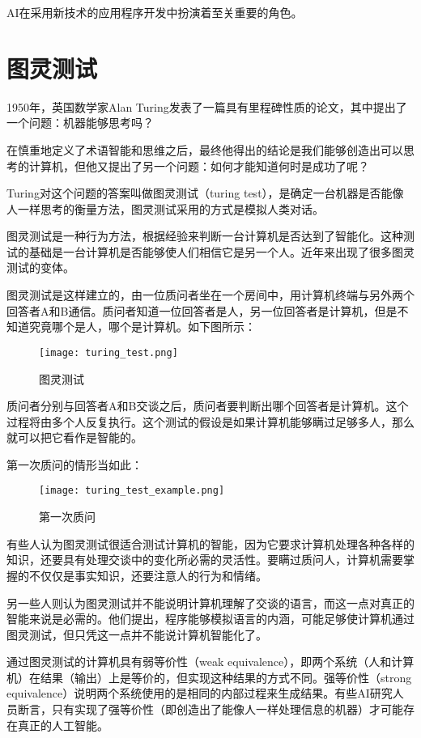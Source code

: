 AI在采用新技术的应用程序开发中扮演着至关重要的角色。

\section{图灵测试}

1950年，英国数学家Alan Turing发表了一篇具有里程碑性质的论文，其中提出了一个问题：机器能够思考吗？

在慎重地定义了术语智能和思维之后，最终他得出的结论是我们能够创造出可以思考的计算机，但他又提出了另一个问题：如何才能知道何时是成功了呢？

Turing对这个问题的答案叫做图灵测试（turing test），是确定一台机器是否能像人一样思考的衡量方法，图灵测试采用的方式是模拟人类对话。

图灵测试是一种行为方法，根据经验来判断一台计算机是否达到了智能化。这种测试的基础是一台计算机是否能够使人们相信它是另一个人。近年来出现了很多图灵测试的变体。

图灵测试是这样建立的，由一位质问者坐在一个房间中，用计算机终端与另外两个回答者A和B通信。质问者知道一位回答者是人，另一位回答者是计算机，但是不知道究竟哪个是人，哪个是计算机。如下图所示：

\begin{figure}[!ht]
\centering
\texttt{[image: turing\_test.png]}
\caption{图灵测试}
\label{turing_test}
\end{figure}

质问者分别与回答者A和B交谈之后，质问者要判断出哪个回答者是计算机。这个过程将由多个人反复执行。这个测试的假设是如果计算机能够瞒过足够多人，那么就可以把它看作是智能的。

第一次质问的情形当如此：

\begin{figure}[!h]
\centering
\texttt{[image: turing\_test\_example.png]}
\caption{第一次质问}
\label{turing_test_example}
\end{figure}

有些人认为图灵测试很适合测试计算机的智能，因为它要求计算机处理各种各样的知识，还要具有处理交谈中的变化所必需的灵活性。要瞒过质问人，计算机需要掌握的不仅仅是事实知识，还要注意人的行为和情绪。

另一些人则认为图灵测试并不能说明计算机理解了交谈的语言，而这一点对真正的智能来说是必需的。他们提出，程序能够模拟语言的内涵，可能足够使计算机通过图灵测试，但只凭这一点并不能说计算机智能化了。

通过图灵测试的计算机具有弱等价性（weak equivalence），即两个系统（人和计算机）在结果（输出）上是等价的，但实现这种结果的方式不同。强等价性（strong equivalence）说明两个系统使用的是相同的内部过程来生成结果。有些AI研究人员断言，只有实现了强等价性（即创造出了能像人一样处理信息的机器）才可能存在真正的人工智能。

